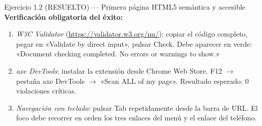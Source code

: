 \begin{cajaejercicio}{Ejercicio 1.2 (RESUELTO) --- Primera página HTML5 semántica y accesible}
\textbf{Verificación obligatoria del éxito:}
\begin{enumerate}
\item \emph{W3C Validator} (\url{https://validator.w3.org/nu/}):
copiar el código completo, pegar en «Validate by direct input»,
pulsar Check. Debe aparecer en verde: «Document checking completed.
No errors or warnings to show.»
\item \emph{axe DevTools}: instalar la extensión desde Chrome Web
Store. F12 $\to$ pestaña axe DevTools $\to$ «Scan ALL of my page».
Resultado esperado: 0 violaciones críticas.
\item \emph{Navegación con teclado}: pulsar Tab repetidamente desde
la barra de URL. El foco debe recorrer en orden los tres enlaces del
menú y el enlace del teléfono.
\end{enumerate}
\end{cajaejercicio}

